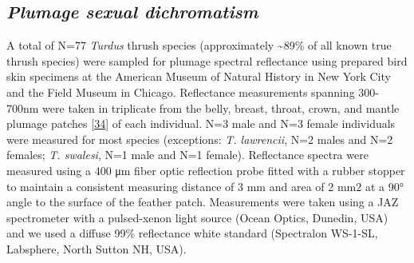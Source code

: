 \documentclass[
  a4paper,
]{article}
\begin{document}
\hypertarget{plumage-sexual-dichromatism}{%
\subsection{\texorpdfstring{\emph{Plumage sexual
dichromatism}}{Plumage sexual dichromatism}}\label{plumage-sexual-dichromatism}}

A total of N=77 \emph{Turdus} thrush species (approximately
\textasciitilde89\% of all known true thrush species) were sampled for
plumage spectral reflectance using prepared bird skin specimens at the
American Museum of Natural History in New York City and the Field Museum
in Chicago. Reflectance measurements spanning 300-700nm were taken in
triplicate from the belly, breast, throat, crown, and mantle plumage
patches {[}\protect\hyperlink{ref-andersson2006}{34}{]} of each
individual. N=3 male and N=3 female individuals were measured for most
species (exceptions: \emph{T. lawrencii}, N=2 males and N=2 females;
\emph{T. swalesi}, N=1 male and N=1 female). Reflectance spectra were
measured using a 400 μm fiber optic reflection probe fitted with a
rubber stopper to maintain a consistent measuring distance of 3 mm and
area of 2 mm2 at a 90° angle to the surface of the feather patch.
Measurements were taken using a JAZ spectrometer with a pulsed-xenon
light source (Ocean Optics, Dunedin, USA) and we used a diffuse 99\%
reflectance white standard (Spectralon WS-1-SL, Labsphere, North Sutton
NH, USA).
\end{document}
